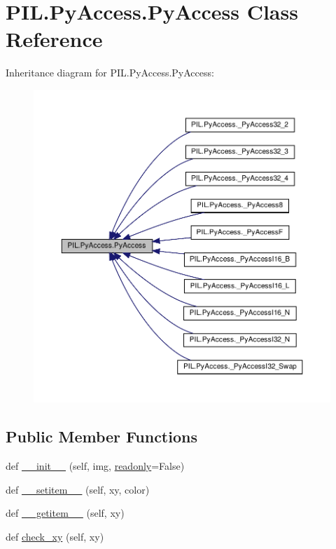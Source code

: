 \hypertarget{classPIL_1_1PyAccess_1_1PyAccess}{}\section{P\+I\+L.\+Py\+Access.\+Py\+Access Class Reference}
\label{classPIL_1_1PyAccess_1_1PyAccess}


Inheritance diagram for P\+I\+L.\+Py\+Access.\+Py\+Access\+:
\nopagebreak
\begin{figure}[H]
\begin{center}
\leavevmode
\includegraphics[width=350pt]{classPIL_1_1PyAccess_1_1PyAccess__inherit__graph}
\end{center}
\end{figure}
\subsection*{Public Member Functions}
\begin{DoxyCompactItemize}
\item 
def \hyperlink{classPIL_1_1PyAccess_1_1PyAccess_ab5a3b2aead8d424c62b6357b0d17dee6}{\+\_\+\+\_\+init\+\_\+\+\_\+} (self, img, \hyperlink{classPIL_1_1PyAccess_1_1PyAccess_ae35e9b5f5d62b7442b659d82023e71d9}{readonly}=False)
\item 
def \hyperlink{classPIL_1_1PyAccess_1_1PyAccess_a9e3e4ded57321fd2b13e259fec7782f3}{\+\_\+\+\_\+setitem\+\_\+\+\_\+} (self, xy, color)
\item 
def \hyperlink{classPIL_1_1PyAccess_1_1PyAccess_a4d2b451c3f84d5652f627bc189689835}{\+\_\+\+\_\+getitem\+\_\+\+\_\+} (self, xy)
\item 
def \hyperlink{classPIL_1_1PyAccess_1_1PyAccess_ab479d9a1daf828d135bc66e4ccbb9a17}{check\+\_\+xy} (self, xy)
\end{DoxyCompactItemize}
